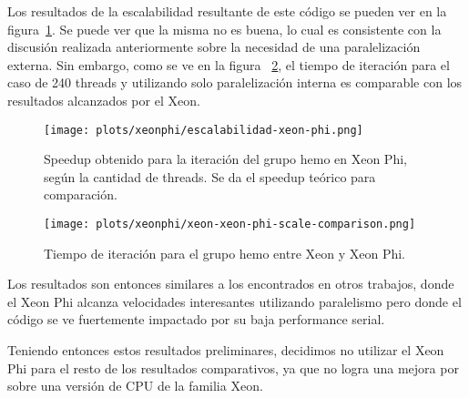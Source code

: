 Los resultados de la escalabilidad resultante de este c\'odigo se pueden ver
en la figura~\ref{fig:xeon-final-scalability}. Se puede ver que la misma no es
buena, lo cual es consistente con la discusi\'on realizada anteriormente sobre
la necesidad de una paralelizaci\'on externa. Sin embargo, como se ve en la figura
~\ref{fig:xeon-xeon-phi-parallelized-iteration}, el tiempo de iteraci\'on
para el caso de 240 threads y utilizando solo paralelizaci\'on interna es
comparable con los resultados alcanzados por el Xeon.

\begin{figure}[htbp]
   \centering
   \texttt{[image: plots/xeonphi/escalabilidad-xeon-phi.png]}
   \caption{Speedup obtenido para la iteraci\'on del grupo hemo en Xeon Phi,
   seg\'un la cantidad de threads. Se da el speedup te\'orico para comparaci\'on.}
   \label{fig:xeon-final-scalability}
\end{figure}

\begin{figure}[htbp]
   \centering
   \texttt{[image: plots/xeonphi/xeon-xeon-phi-scale-comparison.png]}
   \caption{Tiempo de iteraci\'on para el grupo hemo entre Xeon y Xeon Phi.}
   \label{fig:xeon-xeon-phi-parallelized-iteration}
\end{figure}

Los resultados son entonces similares a los encontrados en otros trabajos,
donde el Xeon Phi alcanza velocidades interesantes utilizando paralelismo
pero donde el c\'odigo se ve fuertemente impactado por su baja performance serial.

Teniendo entonces estos resultados preliminares, decidimos no utilizar el Xeon Phi
para el resto de los resultados comparativos, ya que no logra una mejora por sobre
una versi\'on de CPU de la familia Xeon.
